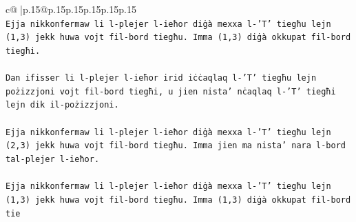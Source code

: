 \documentclass{article}
\begin{document}
{\begin{supertabular}{c@{$\;$}|p{.15\linewidth}@{}p{.15\linewidth}p{.15\linewidth}p{.15\linewidth}p{.15\linewidth}p{.15\linewidth}}
{{{\\ 
\texttt{Ejja nikkonfermaw li l{-}plejer l{-}ieħor diġà mexxa l{-}'T' tiegħu lejn (1,3) jekk huwa vojt fil{-}bord tiegħu. Imma (1,3) diġà okkupat fil{-}bord tiegħi.} \\
\\ 
\texttt{Dan ifisser li l{-}plejer l{-}ieħor irid iċċaqlaq l{-}'T' tiegħu lejn pożizzjoni vojt fil{-}bord tiegħi, u jien nista' nċaqlaq l{-}'T' tiegħi lejn dik il{-}pożizzjoni.} \\
\\ 
\texttt{Ejja nikkonfermaw li l{-}plejer l{-}ieħor diġà mexxa l{-}'T' tiegħu lejn (2,3) jekk huwa vojt fil{-}bord tiegħu. Imma jien ma nista' nara l{-}bord tal{-}plejer l{-}ieħor.} \\
\\ 
\texttt{Ejja nikkonfermaw li l{-}plejer l{-}ieħor diġà mexxa l{-}'T' tiegħu lejn (1,3) jekk huwa vojt fil{-}bord tiegħu. Imma (1,3) diġà okkupat fil{-}bord tie} \\
            }
        }
    }
     \\ \\


\end{supertabular}}
\end{document}
